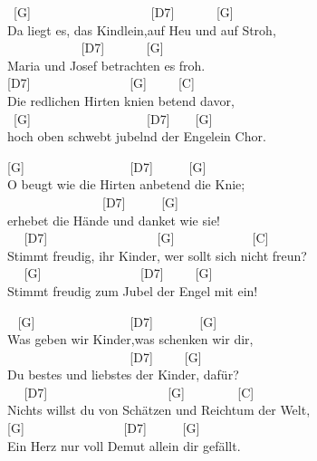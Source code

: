 \documentclass[
  letterpaper,
]{scrbook}
\begin{document}
~{[}G{]} ~ ~ ~ ~ ~ ~ ~ ~ ~ ~ ~ {[}D7{]} ~ ~ ~ ~{[}G{]} ~\\
Da liegt es, das Kindlein,auf Heu und auf Stroh,\\
\hspace*{0.333em} ~ ~ ~ ~ ~ ~ ~ {[}D7{]} ~ ~ ~ ~{[}G{]} ~ ~\\
Maria und Josef betrachten es froh.\\
\hspace*{0.333em} {[}D7{]} ~ ~ ~ ~ ~ ~ ~ ~ ~ {[}G{]} ~ ~ ~{[}C{]} ~ ~\\
Die redlichen Hirten knien betend davor,\\
\hspace*{0.333em} ~{[}G{]} ~ ~ ~ ~ ~ ~ ~ ~ ~ ~ ~{[}D7{]} ~ ~ {[}G{]} ~
~\\
hoch oben schwebt jubelnd der Engelein Chor.

{[}G{]} ~ ~ ~ ~ ~ ~ ~ ~ ~ ~{[}D7{]} ~ ~ ~ {[}G{]} ~\\
O beugt wie die Hirten anbetend die Knie;\\
\hspace*{0.333em} ~ ~ ~ ~ ~ ~ ~ ~ ~ {[}D7{]} ~ ~ ~ {[}G{]} ~ ~\\
erhebet die Hände und danket wie sie!\\
\hspace*{0.333em} ~ ~{[}D7{]} ~ ~ ~ ~ ~ ~ ~ ~ ~ ~ {[}G{]} ~ ~ ~ ~ ~ ~ ~
{[}C{]} ~ ~\\
Stimmt freudig, ihr Kinder, wer sollt\textquotesingle{} sich nicht
freun?\\
\hspace*{0.333em} ~ ~{[}G{]} ~ ~ ~ ~ ~ ~ ~ ~ ~ {[}D7{]} ~ ~ ~{[}G{]} ~ ~
~ ~\\
Stimmt freudig zum Jubel der Engel mit ein!

~ {[}G{]} ~ ~ ~ ~ ~ ~ ~ ~ ~{[}D7{]} ~ ~ ~ ~ {[}G{]} ~\\
Was geben wir Kinder,was schenken wir dir,\\
\hspace*{0.333em} ~ ~ ~ ~ ~ ~ ~ ~ ~ ~ ~ ~{[}D7{]} ~ ~ ~{[}G{]} ~ ~\\
Du bestes und liebstes der Kinder, dafür?\\
\hspace*{0.333em} ~ ~{[}D7{]} ~ ~ ~ ~ ~ ~ ~ ~ ~ ~ ~ {[}G{]} ~ ~ ~ ~
~{[}C{]} ~ ~ ~ ~\\
Nichts willst du von Schätzen und Reichtum der Welt,\\
\hspace*{0.333em} {[}G{]} ~ ~ ~ ~ ~ ~ ~ ~ ~ {[}D7{]} ~ ~ ~ {[}G{]} ~ ~ ~
~\\
Ein Herz nur voll Demut allein dir gefällt.
\end{document}
